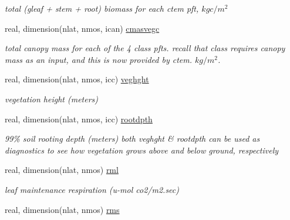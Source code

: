 \begin{DoxyCompactItemize}
\begin{DoxyCompactList}\small\item\em total (gleaf + stem + root) biomass for each ctem pft, $kg c/m^2$ \end{DoxyCompactList}\item 
\hypertarget{structctem__statevars_1_1veg__rot_afd545a97a8bcc67a58a11936c759f275}{}real, dimension(nlat, nmos, ican) \hyperlink{structctem__statevars_1_1veg__rot_afd545a97a8bcc67a58a11936c759f275}{cmasvegc}\label{structctem__statevars_1_1veg__rot_afd545a97a8bcc67a58a11936c759f275}

\begin{DoxyCompactList}\small\item\em total canopy mass for each of the 4 class pfts. recall that class requires canopy mass as an input, and this is now provided by ctem. $kg/m^2$. \end{DoxyCompactList}\item 
\hypertarget{structctem__statevars_1_1veg__rot_a0bacfae79c23cc35b099bfde30c674c4}{}real, dimension(nlat, nmos, icc) \hyperlink{structctem__statevars_1_1veg__rot_a0bacfae79c23cc35b099bfde30c674c4}{veghght}\label{structctem__statevars_1_1veg__rot_a0bacfae79c23cc35b099bfde30c674c4}

\begin{DoxyCompactList}\small\item\em vegetation height (meters) \end{DoxyCompactList}\item 
\hypertarget{structctem__statevars_1_1veg__rot_a9e783615177f44e13d99761ceea9a9cc}{}real, dimension(nlat, nmos, icc) \hyperlink{structctem__statevars_1_1veg__rot_a9e783615177f44e13d99761ceea9a9cc}{rootdpth}\label{structctem__statevars_1_1veg__rot_a9e783615177f44e13d99761ceea9a9cc}

\begin{DoxyCompactList}\small\item\em 99\% soil rooting depth (meters) both veghght \& rootdpth can be used as diagnostics to see how vegetation grows above and below ground, respectively \end{DoxyCompactList}\item 
\hypertarget{structctem__statevars_1_1veg__rot_a10230d76614145054d3a7195bcdd9ee8}{}real, dimension(nlat, nmos) \hyperlink{structctem__statevars_1_1veg__rot_a10230d76614145054d3a7195bcdd9ee8}{rml}\label{structctem__statevars_1_1veg__rot_a10230d76614145054d3a7195bcdd9ee8}

\begin{DoxyCompactList}\small\item\em leaf maintenance respiration (u-\/mol co2/m2.\+sec) \end{DoxyCompactList}\item 
\hypertarget{structctem__statevars_1_1veg__rot_aa280b6ab08fb75612113fd02f3ab4e5e}{}real, dimension(nlat, nmos) \hyperlink{structctem__statevars_1_1veg__rot_aa280b6ab08fb75612113fd02f3ab4e5e}{rms}\label{structctem__statevars_1_1veg__rot_aa280b6ab08fb75612113fd02f3ab4e5e}


\end{DoxyCompactItemize}
